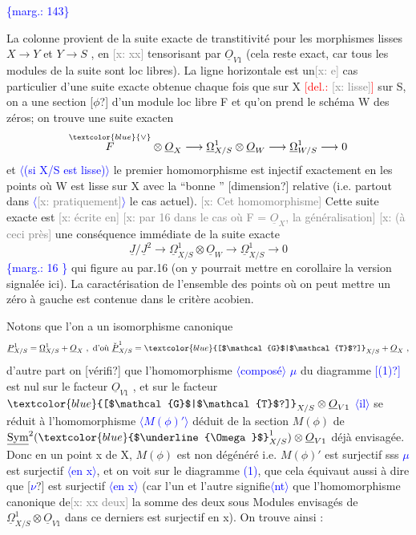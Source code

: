 \documentclass[11pt]{article}
\newcommand{\scanpage}[1]{\par\bigskip\noindent{\small\sffamily[scan #1]}\par}
\newcommand{\mspage}[1]{{\small\sffamily[p.\,#1]}}
\newcommand{\hand}[1]{\textcolor{blue}{#1}}
\let\over\relax
\newcommand{\over}[2]{\textcolor{gray}{#1}\textcolor{blue}{\ensuremath{^{\!\nearrow}}#2}}
\newcommand{\inserted}[2][]{\textcolor{blue}{$\langle$#2$\rangle$}}
\newcommand{\margin}[1]{\textcolor{blue}{\{\textsf{marg.:} #1\}}}
\newcommand{\deleted}[1]{\textcolor{red}{[\textsf{del.:} #1]}}
\newcommand{\xout}[1]{\textcolor{gray}{[\textsf{x:} #1]}}
\newcommand{\unsure}[1]{[#1?]}
\begin{document}
\margin{143}

\clearpage
\scanpage{25/144}
\mspage{\hand{5}}

La colonne provient de la suite exacte de transtitivité pour les
morphismes lisses $X\to Y$ et $Y\to S$ , en \xout{xx} tensorisant par $\underline{O}_{V1}$ (cela reste
exact, car tous les modules de la suite sont loc libres). La ligne
horizontale est un\xout{e} cas particulier d'une suite exacte obtenue chaque
fois que sur X \deleted{\xout{lisse}} sur S, on a une section \unsure{$\phi$} d'un module loc libre F
et qu'on prend le schéma W des zéros; on trouve une suite exacten
\[ \overset{\hand{\vee}}{F}\otimes \underline{O}_X \longrightarrow \underline{\Omega}^1_{X/S}\otimes \underline{O}_W \longrightarrow \underline{\Omega}^1_{W/S} \longrightarrow 0 \]
et \inserted{(si X/S est lisse)} le premier homomorphisme est injectif exactement en les points où
W est lisse sur X avec la ``bonne '' \unsure{dimension} relative (i.e. partout dans
\inserted[typed]{\xout{pratiquement}}
le cas actuel). \xout{Cet homomorphisme} Cette suite exacte est \xout{écrite en}
\xout{par 16 dans le cas où F = $\underline{O}_X$, la généralisation} \xout{(à ceci près} une
conséquence immédiate de la suite exacte
\[ \underline{J}/\underline{J}^2\longrightarrow \underline{\Omega}^1_{X/S}\otimes \underline{O}_W \longrightarrow \underline{\Omega}^1_{X/S} \longrightarrow 0 \]
\margin{16 \textbar} qui figure au par.16 (on y pourrait mettre en corollaire la version
signalée ici). La caractérisation de l'ensemble des points où on
peut mettre un zéro à gauche est contenue dans le critère \over{j}{J}acobien.

Notons que l'on a un isomorphisme canonique
\[ \underline{P}^1_{X/S} = \underline{\Omega}^1_{X/S} + \underline{O}_X \ ,\ \text{d'où}\ \check{\underline{P}}^1_{X/S} = \hand{\unsure{$\mathcal{G}$|$\mathcal{T}$}}_{X/S} + \underline{O}_X \ , \]
d'autre part on \unsure{vérifi\over{e}{é}} que l'homomorphisme \inserted{composé} \hand{$\mu$} du diagramme \hand{\unsure{(1)}} est nul
sur le facteur $\underline{O}_{V1}$ , et sur le facteur $\hand{\unsure{$\mathcal{G}$|$\mathcal{T}$}}_{X/S}\otimes\underline{O}_{V1}$ \inserted{il} se réduit à
l'homomorphisme \inserted{$M(\phi)'$} déduit de la section $M(\phi)$ de $\underline{\mathrm{Sym}}^2(\hand{$\underline{\Omega}$}^1_{X/S})\otimes \underline{O}_{V1}$ déjà
envisagée. Donc en un point x de X, $M(\phi)$ est non dégénéré i.e. $M(\phi)'$
est surjectif sss \hand{$\mu$} est surjectif \inserted{en x}, et on voit sur le diagramme \hand{(1)},
que cela équivaut aussi à dire que \unsure{\hand{$\nu$}} est surjectif \inserted{en x} (car l'un et l'autre
signifie\inserted{nt} que l'homomorphisme canonique de\xout{xx deux} la somme des deux sous
Modules envisagés de $\underline{\Omega}^1_{X/S}\otimes \underline{O}_{V1}$ dans ce derniers est surjectif en
x). On trouve ainsi :
\end{document}
